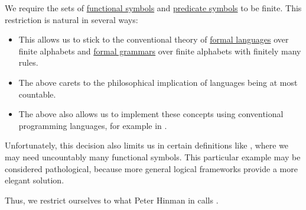 \begin{remark}\label{rem:uncountable_first_order_language}
  We require the sets of \hyperref[def:first_order_language/fun]{functional symbols} and \hyperref[def:first_order_language/fun]{predicate symbols} to be finite. This restriction is natural in several ways:
  \begin{itemize}
    \item This allows us to stick to the conventional theory of \hyperref[def:formal_language/language]{formal languages} over finite alphabets and \hyperref[def:formal_grammar]{formal grammars} over finite alphabets with finitely many rules.

    \item The above carets to the philosophical implication of languages being at most countable.

    \item The above also allows us to implement these concepts using conventional programming languages, for example in \cite{code}.
  \end{itemize}

  Unfortunately, this decision also limits us in certain definitions like , where we may need uncountably many functional symbols. This particular example may be considered pathological, because more general logical frameworks provide a more elegant solution.

  Thus, we restrict ourselves to what Peter Hinman in \cite[def. 2.1.27]{Hinman2005} calls .
\end{remark}

